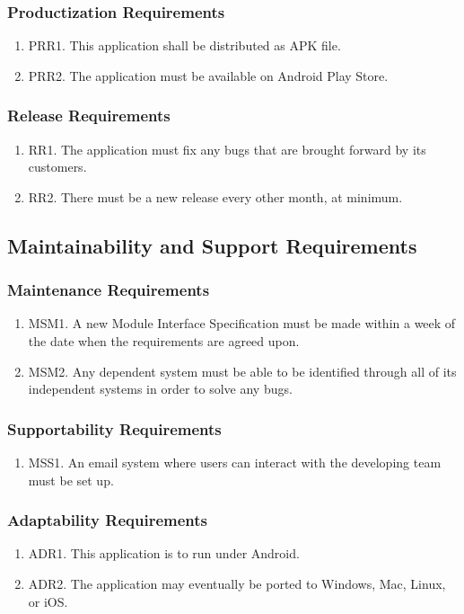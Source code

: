 \documentclass[]{article}
\begin{document}
\subsubsection{Productization Requirements}
\begin{enumerate}
	\item PRR1. This application shall be distributed as APK file.
	\item PRR2. The application must be available on Android Play Store.
\end{enumerate}

\subsubsection{Release Requirements}
\begin{enumerate}
	\item RR1. The application must fix any bugs that are brought forward by its customers.
	\item RR2. There must be a new release every other month, at minimum.
\end{enumerate}

\subsection{Maintainability and Support Requirements}
\subsubsection{Maintenance Requirements}
\begin{enumerate}
	\item MSM1. A new Module Interface Specification must be made within a week of the date when the requirements are agreed upon.
	\item MSM2. Any dependent system must be able to be identified through all of its independent systems in order to solve any bugs.
\end{enumerate}

\subsubsection{Supportability Requirements}
\begin{enumerate}
	\item MSS1. An email system where users can interact with the developing team must be set up.
\end{enumerate}

\subsubsection{Adaptability Requirements}
\begin{enumerate}
	\item ADR1. This application is to run under Android.
	\item ADR2. The application may eventually be ported to Windows, Mac, Linux, or iOS.
\end{enumerate}
\end{document}
